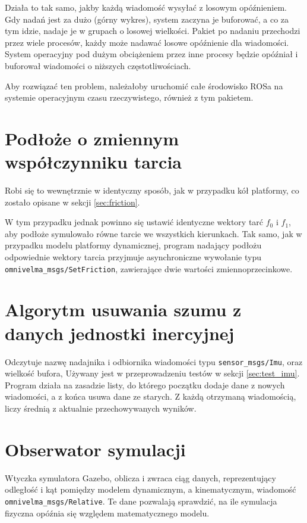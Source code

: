 	Działa to tak samo, jakby każdą wiadomość wysyłać z losowym opóźnieniem.
	Gdy nadań jest za dużo (górny wykres), system zaczyna je buforować, a co za tym idzie, nadaje je w grupach o losowej wielkości.
	Pakiet po nadaniu przechodzi przez wiele procesów, każdy może nadawać losowe opóźnienie dla wiadomości.
	System operacyjny pod dużym obciążeniem przez inne procesy będzie opóźniał i buforował wiadomości o niższych częstotliwościach.
	
	Aby rozwiązać ten problem, należałoby uruchomić całe środowisko ROSa na systemie operacyjnym czasu rzeczywistego,
	również z tym pakietem.
	
\section{Podłoże o zmiennym współczynniku tarcia}
	Robi się to wewnętrznie w identyczny sposób, jak w przypadku kół platformy, co zostało opisane w sekcji \ref{sec:friction}.
	
	W tym przypadku jednak powinno się ustawić identyczne wektory tarć $f_0$ i $f_1$, aby podłoże symulowało równe tarcie we wszystkich kierunkach.
	Tak samo, jak w przypadku modelu platformy dynamicznej, program nadający podłożu odpowiednie wektory tarcia przyjmuje asynchroniczne wywołanie 
	typu \texttt{omnivelma\_msgs/SetFriction}, zawierające dwie wartości zmiennoprzecinkowe.
	
	
\section{Algorytm usuwania szumu z danych jednostki inercyjnej}
	Odczytuje nazwę nadajnika i odbiornika wiadomości typu \texttt{sensor\_msgs/Imu}, oraz wielkość bufora,
	Używany jest w przeprowadzeniu testów w sekcji \ref{sec:test_imu}.
	Program działa na zasadzie listy, do którego początku dodaje dane z nowych wiadomości, a z końca usuwa dane ze starych.
	Z każdą otrzymaną wiadomością, liczy średnią z aktualnie przechowywanych wyników.
	
\section{Obserwator symulacji}
	Wtyczka symulatora Gazebo, oblicza i zwraca ciąg danych, reprezentujący 
	odległość i kąt pomiędzy modelem dynamicznym, a kinematycznym, wiadomość \texttt{omnivelma\_msgs/Relative}.
	Te dane pozwalają sprawdzić, na ile symulacja fizyczna opóźnia się względem matematycznego modelu.
	
